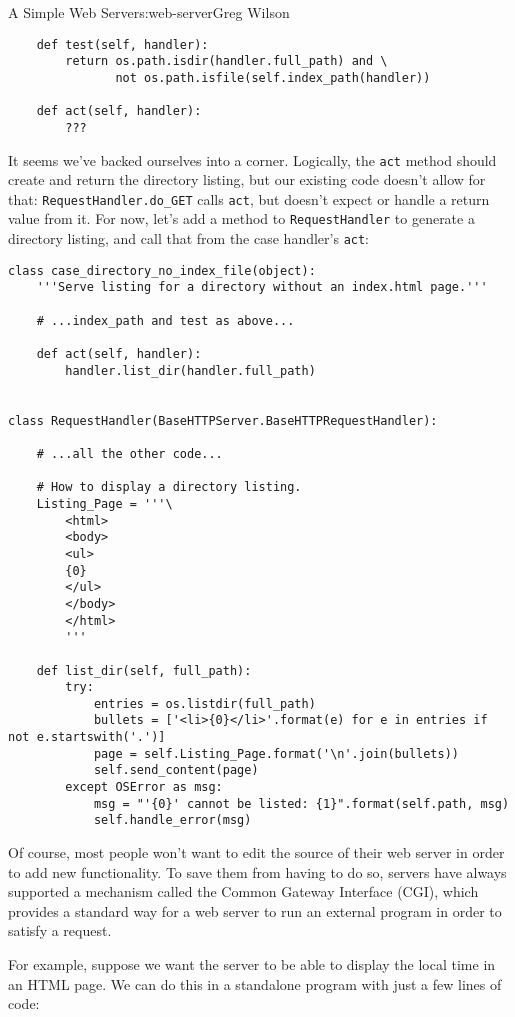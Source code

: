 \begin{aosachapter}{A Simple Web Server}{s:web-server}{Greg Wilson}
\begin{verbatim}
    def test(self, handler):
        return os.path.isdir(handler.full_path) and \
               not os.path.isfile(self.index_path(handler))

    def act(self, handler):
        ???
\end{verbatim}

It seems we've backed ourselves into a corner. Logically, the
\texttt{act} method should create and return the directory listing, but
our existing code doesn't allow for that:
\texttt{RequestHandler.do\_GET} calls \texttt{act}, but doesn't expect
or handle a return value from it. For now, let's add a method to
\texttt{RequestHandler} to generate a directory listing, and call that
from the case handler's \texttt{act}:

\begin{verbatim}
class case_directory_no_index_file(object):
    '''Serve listing for a directory without an index.html page.'''

    # ...index_path and test as above...

    def act(self, handler):
        handler.list_dir(handler.full_path)


class RequestHandler(BaseHTTPServer.BaseHTTPRequestHandler):

    # ...all the other code...

    # How to display a directory listing.
    Listing_Page = '''\
        <html>
        <body>
        <ul>
        {0}
        </ul>
        </body>
        </html>
        '''

    def list_dir(self, full_path):
        try:
            entries = os.listdir(full_path)
            bullets = ['<li>{0}</li>'.format(e) for e in entries if not e.startswith('.')]
            page = self.Listing_Page.format('\n'.join(bullets))
            self.send_content(page)
        except OSError as msg:
            msg = "'{0}' cannot be listed: {1}".format(self.path, msg)
            self.handle_error(msg)
\end{verbatim}

\label{the-cgi-protocol}

Of course, most people won't want to edit the source of their web server
in order to add new functionality. To save them from having to do so,
servers have always supported a mechanism called the Common Gateway
Interface (CGI), which provides a standard way for a web server to run
an external program in order to satisfy a request.

For example, suppose we want the server to be able to display the local
time in an HTML page. We can do this in a standalone program with just a
few lines of code:


\end{aosachapter}
